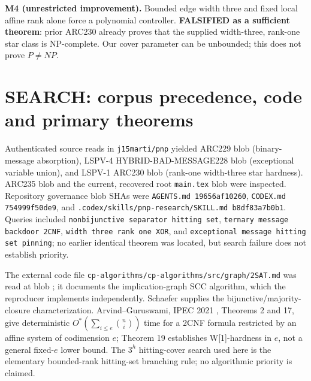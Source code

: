 \documentclass[10pt]{article}
\begin{document}
\noindent\textbf{M4 (unrestricted improvement).} Bounded edge width three and fixed local affine rank alone force a polynomial controller. \textbf{FALSIFIED as a sufficient theorem}: prior ARC230 already proves that the supplied width-three, rank-one star class is NP-complete. Our cover parameter can be unbounded; this does not prove $P\ne NP$.

\section{SEARCH: corpus precedence, code and primary theorems}
Authenticated source reads in \texttt{j15marti/pnp} yielded ARC229 blob  (binary-message absorption), LSPV-4 HYBRID-BAD-MESSAGE228 blob  (exceptional variable union), and LSPV-1 ARC230 blob  (rank-one width-three star hardness). ARC235 blob  and the current, recovered root \texttt{main.tex} blob  were inspected. Repository governance blob SHAs were \texttt{AGENTS.md 19656af10260}, \texttt{CODEX.md 754999f50de9}, and \texttt{.codex/skills/pnp-research/SKILL.md b8df83a7b0b1}. Queries included \texttt{nonbijunctive separator hitting set}, \texttt{ternary message backdoor 2CNF}, \texttt{width three rank one XOR}, and \texttt{exceptional message hitting set pinning}; no earlier identical theorem was located, but search failure does not establish priority.

The external code file \texttt{cp-algorithms/cp-algorithms/src/graph/2SAT.md} was read at blob ; it documents the implication-graph SCC algorithm, which the reproducer implements independently. Schaefer \cite{Schaefer1978} supplies the bijunctive/majority-closure characterization. Arvind--Guruswami, IPEC 2021 \cite{ArvindGuruswami2021}, Theorems 2 and 17, give deterministic $O^*(\sum_{i\le e}\binom{n}{i})$ time for a 2CNF formula restricted by an affine system of codimension $e$; Theorem 19 establishes W[1]-hardness in $e$, not a general fixed-$e$ lower bound. The $3^h$ hitting-cover search used here is the elementary bounded-rank hitting-set branching rule; no algorithmic priority is claimed.
\end{document}
